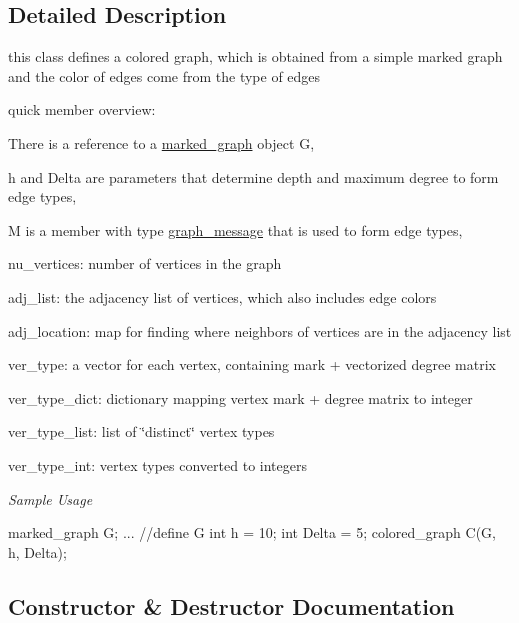 \subsection{Detailed Description}
this class defines a colored graph, which is obtained from a simple marked graph and the color of edges come from the type of edges 

quick member overview\+:


\begin{DoxyItemize}
\item There is a reference to a \hyperlink{classmarked__graph}{marked\+\_\+graph} object G,
\item h and Delta are parameters that determine depth and maximum degree to form edge types,
\item M is a member with type \hyperlink{classgraph__message}{graph\+\_\+message} that is used to form edge types,
\item nu\+\_\+vertices\+: number of vertices in the graph
\item adj\+\_\+list\+: the adjacency list of vertices, which also includes edge colors
\item adj\+\_\+location\+: map for finding where neighbors of vertices are in the adjacency list
\item ver\+\_\+type\+: a vector for each vertex, containing mark + vectorized degree matrix
\item ver\+\_\+type\+\_\+dict\+: dictionary mapping vertex mark + degree matrix to integer
\item ver\+\_\+type\+\_\+list\+: list of \char`\"{}distinct\char`\"{} vertex types
\item ver\+\_\+type\+\_\+int\+: vertex types converted to integers
\end{DoxyItemize}

{\itshape Sample Usage} \begin{DoxyVerb}marked_graph G;
... //define G
int h = 10;
int Delta = 5;
colored_graph C(G, h, Delta);\end{DoxyVerb}
 

\subsection{Constructor \& Destructor Documentation}
\mbox{\label{classcolored__graph_a0374481a0474ac8e9b77689f74b5ed9b}} 
